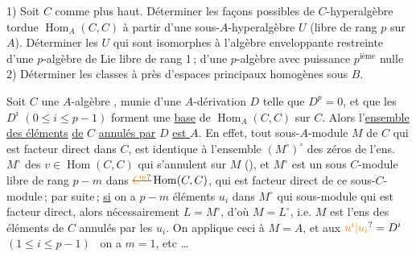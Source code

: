  1) Soit $C$ comme plus haut. Déterminer  les façons possibles de   $C$-hyperalgèbre  tordue $\operatorname{Hom}_A(C,C)$ à partir d'une sous-$A$-hyperalgèbre $U$
(libre de rang $p$ sur $A$). Déterminer les $U$  qui sont isomorphes à l'algèbre enveloppante restreinte d'une $p$-algèbre de Lie  libre de rang 1\,; d'une  $p$-algèbre  avec puissance $p^{\text{ième}}$ nulle
2) Déterminer les classes à  près d'espaces  principaux homogènes sous $B$.


Soit $C$ une $A$-algèbre , munie d'une $A$-dérivation $D$ telle que $D^p=0$, et que les $D^i$ $(0\leq i\leq p-1)$ forment une \uline{base} de $\operatorname{Hom}_A(C,C)$ sur $C$.
Alors l'\uline{ensemble des éléments} \uline{de} $C$ \uline{annulés par} $D$ \uline{est $A$}. 
En effet, tout sous-$A$-module $M$ de $C$ qui est  facteur direct  dans $C$,
est identique à l'ensemble $(M^\circ)^\circ$ des zéros de l'ens. $M^\circ$ des $v\in\operatorname{Hom}(C,C)$ qui s'annulent sur $M$ (), et $M^\circ$ est un sous $C$-module libre de rang $p-m$ dans $\deleted{\unsure{C^p}}\operatorname{Hom}(C,C)$,
 qui est facteur direct de ce sous-$C$-module\,; par suite\,; \uline{si}
on a $p-m$ éléments $u_i$ dans $M^\circ$ qui   sous-module   qui est facteur direct,
alors nécessairement $L=M^\circ$, d'où $M=L^\circ$, i.e. $M$ est l'ens des éléments de $C$ annulés par les $u_i$. On applique ceci
à $M=A$, et aux $\unsure{u^i|u_i}=D^i$ $(1\leq i\leq p-1)$ \textendash\ on a $m=1$, etc \ldots


